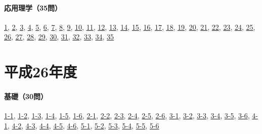 \paragraph{応用理学（35問）} \hyperref[q:h25-reg-applied-01]{1}, \hyperref[q:h25-reg-applied-02]{2}, \hyperref[q:h25-reg-applied-03]{3}, \hyperref[q:h25-reg-applied-04]{4}, \hyperref[q:h25-reg-applied-05]{5}, \hyperref[q:h25-reg-applied-06]{6}, \hyperref[q:h25-reg-applied-07]{7}, \hyperref[q:h25-reg-applied-08]{8}, \hyperref[q:h25-reg-applied-09]{9}, \hyperref[q:h25-reg-applied-10]{10}, \hyperref[q:h25-reg-applied-11]{11}, \hyperref[q:h25-reg-applied-12]{12}, \hyperref[q:h25-reg-applied-13]{13}, \hyperref[q:h25-reg-applied-14]{14}, \hyperref[q:h25-reg-applied-15]{15}, \hyperref[q:h25-reg-applied-16]{16}, \hyperref[q:h25-reg-applied-17]{17}, \hyperref[q:h25-reg-applied-18]{18}, \hyperref[q:h25-reg-applied-19]{19}, \hyperref[q:h25-reg-applied-20]{20}, \hyperref[q:h25-reg-applied-21]{21}, \hyperref[q:h25-reg-applied-22]{22}, \hyperref[q:h25-reg-applied-23]{23}, \hyperref[q:h25-reg-applied-24]{24}, \hyperref[q:h25-reg-applied-25]{25}, \hyperref[q:h25-reg-applied-26]{26}, \hyperref[q:h25-reg-applied-27]{27}, \hyperref[q:h25-reg-applied-28]{28}, \hyperref[q:h25-reg-applied-29]{29}, \hyperref[q:h25-reg-applied-30]{30}, \hyperref[q:h25-reg-applied-31]{31}, \hyperref[q:h25-reg-applied-32]{32}, \hyperref[q:h25-reg-applied-33]{33}, \hyperref[q:h25-reg-applied-34]{34}, \hyperref[q:h25-reg-applied-35]{35}
\section{平成26年度}
\paragraph{基礎（30問）} \hyperref[q:h26-reg-basic-1-1]{1-1}, \hyperref[q:h26-reg-basic-1-2]{1-2}, \hyperref[q:h26-reg-basic-1-3]{1-3}, \hyperref[q:h26-reg-basic-1-4]{1-4}, \hyperref[q:h26-reg-basic-1-5]{1-5}, \hyperref[q:h26-reg-basic-1-6]{1-6}, \hyperref[q:h26-reg-basic-2-1]{2-1}, \hyperref[q:h26-reg-basic-2-2]{2-2}, \hyperref[q:h26-reg-basic-2-3]{2-3}, \hyperref[q:h26-reg-basic-2-4]{2-4}, \hyperref[q:h26-reg-basic-2-5]{2-5}, \hyperref[q:h26-reg-basic-2-6]{2-6}, \hyperref[q:h26-reg-basic-3-1]{3-1}, \hyperref[q:h26-reg-basic-3-2]{3-2}, \hyperref[q:h26-reg-basic-3-3]{3-3}, \hyperref[q:h26-reg-basic-3-4]{3-4}, \hyperref[q:h26-reg-basic-3-5]{3-5}, \hyperref[q:h26-reg-basic-3-6]{3-6}, \hyperref[q:h26-reg-basic-4-1]{4-1}, \hyperref[q:h26-reg-basic-4-2]{4-2}, \hyperref[q:h26-reg-basic-4-3]{4-3}, \hyperref[q:h26-reg-basic-4-4]{4-4}, \hyperref[q:h26-reg-basic-4-5]{4-5}, \hyperref[q:h26-reg-basic-4-6]{4-6}, \hyperref[q:h26-reg-basic-5-1]{5-1}, \hyperref[q:h26-reg-basic-5-2]{5-2}, \hyperref[q:h26-reg-basic-5-3]{5-3}, \hyperref[q:h26-reg-basic-5-4]{5-4}, \hyperref[q:h26-reg-basic-5-5]{5-5}, \hyperref[q:h26-reg-basic-5-6]{5-6}
